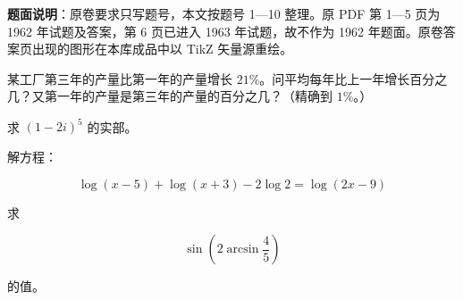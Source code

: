 

\begin{gktip}
\textbf{题面说明}：原卷要求只写题号，本文按题号 1—10 整理。原 PDF 第 1—5 页为 1962 年试题及答案，第 6 页已进入 1963 年试题，故不作为 1962 年题面。原卷答案页出现的图形在本库成品中以 TikZ 矢量源重绘。
\end{gktip}


\begin{question}
某工厂第三年的产量比第一年的产量增长 $21\%$。问平均每年比上一年增长百分之几？又第一年的产量是第三年的产量的百分之几？（精确到 $1\%$。）

\end{question}
\begin{question}
求 $(1-2i)^5$ 的实部。

\end{question}
\begin{question}
解方程：

\nopagebreak[4]
\[
\log(x-5)+\log(x+3)-2\log2=\log(2x-9)
\]

\end{question}
\begin{question}
求

\nopagebreak[4]
\[
\sin\left(2\arcsin\frac45\right)
\]

的值。

\end{question}

